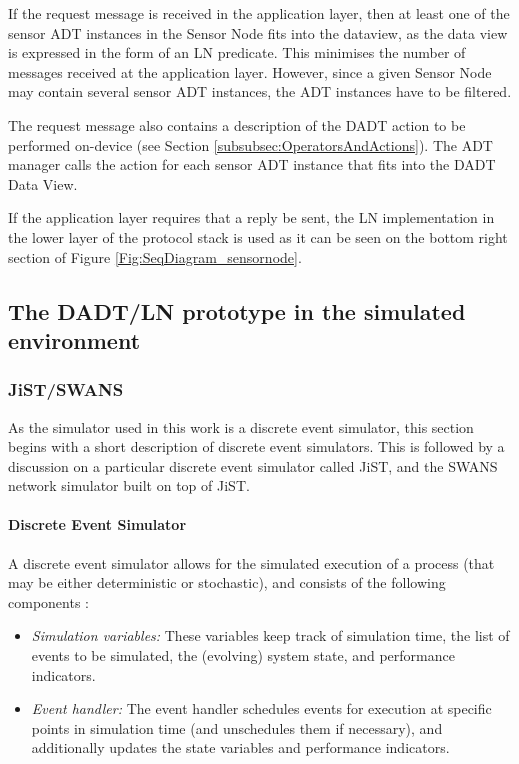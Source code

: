 If the request message is received in the application layer, then at least one of
the sensor ADT instances in the Sensor Node fits into the dataview, as the data
view is expressed in the form of an LN predicate. This minimises the number of
messages received at the application layer. However, since a given Sensor Node
may contain several sensor ADT instances, the ADT instances have to be filtered.

The request message also contains a description of the DADT action to be
performed on-device (see Section
\ref{subsubsec:OperatorsAndActions}). The ADT manager calls the action for each
sensor ADT instance that fits into the DADT Data View. 

If the application layer requires that a reply be sent, the LN implementation in
the lower layer of the protocol stack is used as it can be seen on the bottom
right section of Figure \ref{Fig:SeqDiagram_sensornode}.



\subsection{The DADT/LN prototype in the simulated environment}
\subsubsection {JiST/SWANS} \label{sec:jistswans}

As the simulator used in this work is a discrete event simulator, this section 
begins with a short description of discrete event simulators. 
This is followed by a discussion on a particular discrete event simulator
called JiST, and the SWANS network simulator built on top of JiST.

\paragraph{Discrete Event Simulator}

A discrete event simulator allows for the simulated execution of a process (that
may be either deterministic or stochastic), and consists of the following
components \cite{Shankar_DiscreteEventSim}:

\begin{itemize}
  \item \emph{Simulation variables:} These variables keep track of simulation 
  time, the list of events to be simulated, the (evolving) system state, and 
  performance indicators.
  \item \emph{Event handler:} The event handler schedules events for execution 
  at specific points in simulation time (and unschedules them if necessary), 
  and additionally updates the state variables and performance indicators.
\end{itemize}
 
